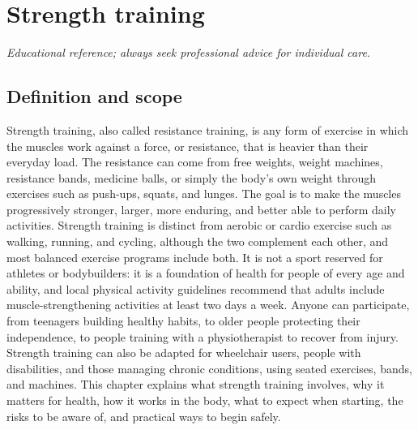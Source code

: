 \chapter{Strength training}

\medskip
\noindent\textit{Educational reference; always seek professional advice for individual care.}

\section*{Definition and scope}
Strength training, also called resistance training, is any form of exercise in which the muscles work against a force, or resistance, that is heavier than their everyday load. The resistance can come from free weights, weight machines, resistance bands, medicine balls, or simply the body's own weight through exercises such as push-ups, squats, and lunges. The goal is to make the muscles progressively stronger, larger, more enduring, and better able to perform daily activities. Strength training is distinct from aerobic or cardio exercise such as walking, running, and cycling, although the two complement each other, and most balanced exercise programs include both. It is not a sport reserved for athletes or bodybuilders: it is a foundation of health for people of every age and ability, and local physical activity guidelines recommend that adults include muscle-strengthening activities at least two days a week. Anyone can participate, from teenagers building healthy habits, to older people protecting their independence, to people training with a physiotherapist to recover from injury. Strength training can also be adapted for wheelchair users, people with disabilities, and those managing chronic conditions, using seated exercises, bands, and machines. This chapter explains what strength training involves, why it matters for health, how it works in the body, what to expect when starting, the risks to be aware of, and practical ways to begin safely.

